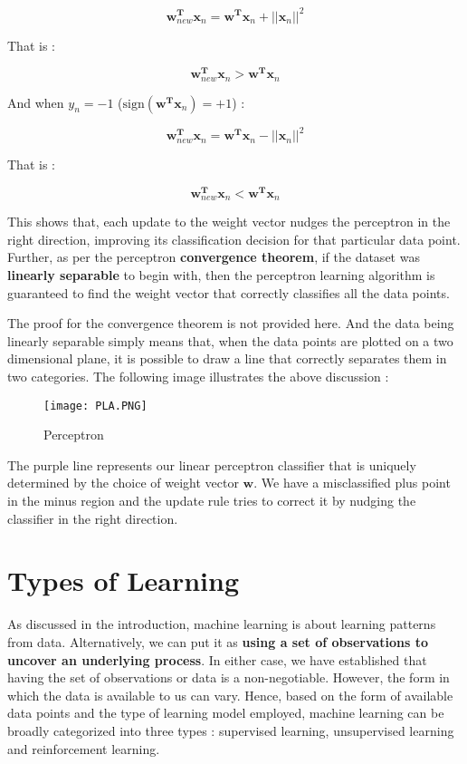 \documentclass[12pt, letterpaper]{article}
\begin{document}
\begin{displaymath}
    \mathbf{w}_{new}^\mathbf{T}\mathbf{x}_n = \mathbf{w^T}\mathbf{x}_n + ||\mathbf{x}_n||^2
\end{displaymath}

That is : 

\begin{displaymath}
    \mathbf{w}_{new}^\mathbf{T}\mathbf{x}_n > \mathbf{w^T}\mathbf{x}_n
\end{displaymath}

And when $y_n = -1$ ($\text{sign}(\mathbf{w^T}\mathbf{x}_n) = +1$) : 

\begin{displaymath}
    \mathbf{w}_{new}^\mathbf{T}\mathbf{x}_n = \mathbf{w^T}\mathbf{x}_n - ||\mathbf{x}_n||^2
\end{displaymath}

That is : 

\begin{displaymath}
    \mathbf{w}_{new}^\mathbf{T}\mathbf{x}_n < \mathbf{w^T}\mathbf{x}_n
\end{displaymath}

This shows that, each update to the weight vector nudges the perceptron in the right direction, improving its classification decision for that particular data point.
Further, as per the perceptron \textbf{convergence theorem}, if the dataset was \textbf{linearly separable} to begin with, then the perceptron learning algorithm is guaranteed to find the weight vector that correctly classifies all the data points.

The proof for the convergence theorem is not provided here. And the data being linearly separable simply means that, when the data points are plotted on a two dimensional plane, it is possible to draw a line that correctly separates them in two categories. The following image illustrates the above discussion : 

\begin{figure}[H]
    \centering
    \texttt{[image: PLA.PNG]}
    \caption{Perceptron}
    \label{perceptron}
\end{figure}

The purple line represents our linear perceptron classifier that is uniquely determined by the choice of weight vector $\mathbf{w}$. We have a misclassified plus point in the minus region and the update rule tries to correct it by nudging the classifier in the right direction.


\section{Types of Learning}
As discussed in the introduction, machine learning is about learning patterns from data. Alternatively, we can put it as \textbf{using a set of observations to uncover an underlying process}. In either case, we have established that having the set of observations or data is a non-negotiable. However, the form in which the data is available to us can vary. Hence, based on the form of available data points and the type of learning model employed, machine learning can be broadly categorized into three types : supervised learning, unsupervised learning and reinforcement learning.  
\end{document}
